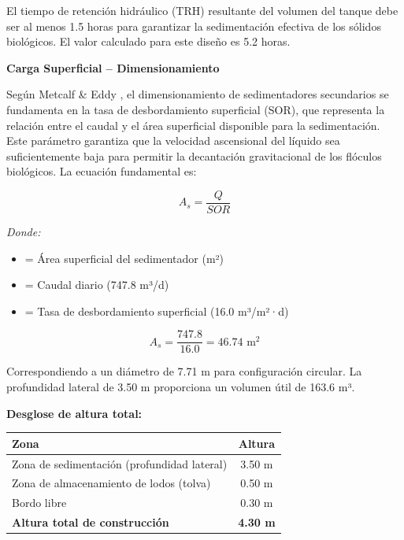 \documentclass[12pt,a4paper]{article}
\begin{document}
El tiempo de retención hidráulico (TRH) resultante del volumen del tanque debe ser al menos 1.5 horas para garantizar la sedimentación efectiva de los sólidos biológicos. El valor calculado para este diseño es 5.2 horas.

\textbf{Carga Superficial -- Dimensionamiento}

Según Metcalf \& Eddy \cite{metcalf2014}, el dimensionamiento de sedimentadores secundarios se fundamenta en la tasa de desbordamiento superficial (SOR), que representa la relación entre el caudal y el área superficial disponible para la sedimentación. Este parámetro garantiza que la velocidad ascensional del líquido sea suficientemente baja para permitir la decantación gravitacional de los flóculos biológicos. La ecuación fundamental es:

\begin{equation}
A_s = \frac{Q}{SOR}
\end{equation}

\textit{Donde:}
\begin{itemize}[noitemsep,leftmargin=2em]
    \item[$A_s$] = Área superficial del sedimentador (m²)
    \item[$Q$] = Caudal diario (747.8 m³/d)
    \item[$SOR$] = Tasa de desbordamiento superficial (16.0 m³/m²·d)
\end{itemize}

\begin{equation}
A_s = \frac{747.8}{16.0} = 46.74 \text{ m}^2
\end{equation}

Correspondiendo a un diámetro de 7.71 m para configuración circular. La profundidad lateral de 3.50 m proporciona un volumen útil de 163.6 m³.

\textbf{Desglose de altura total:}

\begin{table}[H]
\centering
\small
\begin{tabular}{lc}
\toprule
Zona & Altura \\
\midrule
Zona de sedimentación (profundidad lateral) & 3.50 m \\
Zona de almacenamiento de lodos (tolva) & 0.50 m \\
Bordo libre & 0.30 m \\
\midrule
\textbf{Altura total de construcción} & \textbf{4.30 m} \\
\bottomrule
\end{tabular}
\end{table}
\end{document}
